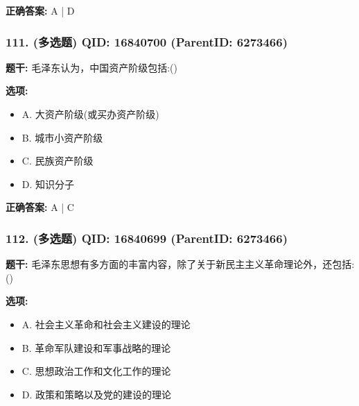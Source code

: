 \documentclass[12pt,UTF8]{ctexart}
\begin{document}
\textbf{正确答案:}
A | D

\vspace{0.3em}\hrulefill\vspace{0.7em}

\subsubsection*{111. (多选题) \small QID: 16840700 (ParentID: 6273466)}

\textbf{题干:}
毛泽东认为，中国资产阶级包括:()



\textbf{选项:}
\begin{itemize}[leftmargin=*]

  \item A. 大资产阶级(或买办资产阶级)

  \item B. 城市小资产阶级

  \item C. 民族资产阶级

  \item D. 知识分子

\end{itemize}

\textbf{正确答案:}
A | C

\vspace{0.3em}\hrulefill\vspace{0.7em}

\subsubsection*{112. (多选题) \small QID: 16840699 (ParentID: 6273466)}

\textbf{题干:}
毛泽东思想有多方面的丰富内容，除了关于新民主主义革命理论外，还包括:()



\textbf{选项:}
\begin{itemize}[leftmargin=*]

  \item A. 社会主义革命和社会主义建设的理论

  \item B. 革命军队建设和军事战略的理论

  \item C. 思想政治工作和文化工作的理论

  \item D. 政策和策略以及党的建设的理论

\end{itemize}
\end{document}
